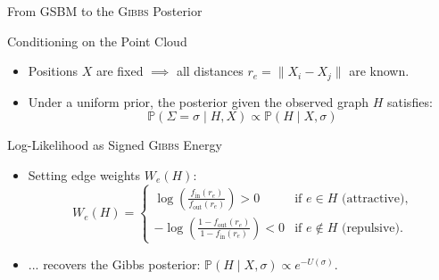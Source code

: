 \documentclass[A4,svgnames,9pt,aspectratio=169]{beamer}
\begin{document}
\begin{frame}{From GSBM to the \textsc{Gibbs} Posterior}
  \begin{block}{Conditioning on the Point Cloud}
    \begin{itemize}
      \item Positions $X$ are fixed $\implies$ all distances $r_e = \|X_i - X_j\|$ are known.
      \item Under a uniform prior, the posterior given the observed graph $H$ satisfies:
        \begin{equation*}
            \mathbb{P}(\Sigma = \sigma \mid H, X) \propto \mathbb{P}(H \mid X, \sigma)
        \end{equation*}
    \end{itemize}
  \end{block}
  \begin{block}{Log-Likelihood as Signed \textsc{Gibbs} Energy}
    \begin{itemize}
      \item Setting edge weights $W_e(H)$:
        \begin{equation*}
            W_e(H)=
            \begin{cases}
                \displaystyle \log\left(\frac{f_{\mathrm{in}}(r_e)}{f_{\mathrm{out}}(r_e)}\right) > 0 & \text{if } e\in H \text{ (attractive),}\\[2ex]
                \displaystyle -\log\left(\frac{1-f_{\mathrm{out}}(r_e)}{1-f_{\mathrm{in}}(r_e)}\right) < 0 & \text{if } e\notin H \text{ (repulsive).}
            \end{cases}
        \end{equation*}
      \item ... recovers the Gibbs posterior: $\mathbb{P}(H \mid X, \sigma) \propto e^{-U(\sigma)}$.
    \end{itemize}
  \end{block}
\end{frame}
\end{document}
